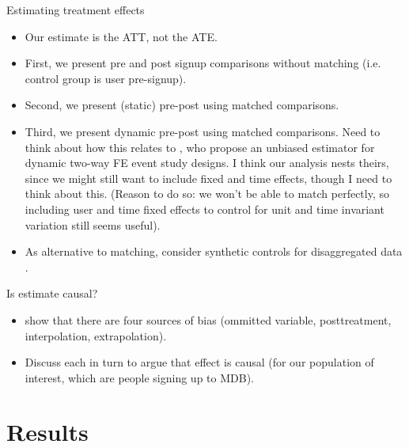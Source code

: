 \documentclass[a4paper, 11pt]{article}
\begin{document}

Estimating treatment effects
\begin{itemize}

    \item Our estimate is the ATT, not the ATE. 

    \item First, we present pre and post signup comparisons without matching
        (i.e. control group is user pre-signup).

    \item Second, we present (static) pre-post using matched comparisons.

    \item Third, we present dynamic pre-post using matched comparisons. Need to
        think about how this relates to \citet{sun2021estimating}, who propose
        an unbiased estimator for dynamic two-way FE event study designs. I
        think our analysis nests theirs, since we might still want to include
        fixed and time effects, though I need to think about this. (Reason to
        do so: we won't be able to match perfectly, so including user and time
        fixed effects to control for unit and time invariant variation still
        seems useful).

    \item As alternative to matching, consider synthetic controls for
        disaggregated data \citep{abadie2021penalized}.

\end{itemize}

Is estimate causal?
\begin{itemize}
    \item \citet{king2006dangers} show that there are four sources of bias
        (ommitted variable, posttreatment, interpolation, extrapolation).
    
    \item Discuss each in turn to argue that effect is causal (for our population
        of interest, which are people signing up to MDB). 
\end{itemize}


% 
\section{Results}%
\label{sec:results}
\end{document}
